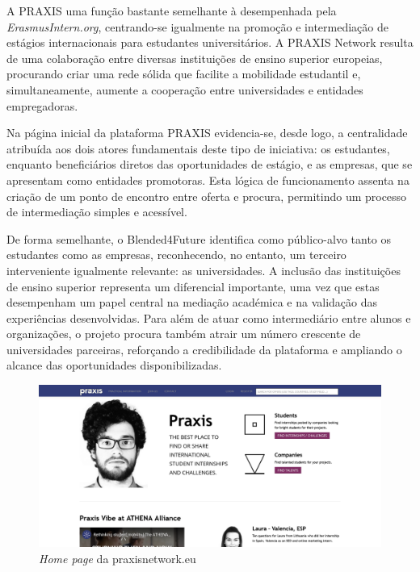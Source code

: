 A PRAXIS uma função bastante semelhante à desempenhada pela \textit{ErasmusIntern.org}, centrando-se igualmente na promoção e intermediação de estágios internacionais para estudantes universitários. A PRAXIS Network resulta de uma colaboração entre diversas instituições de ensino superior europeias, procurando criar uma rede sólida que facilite a mobilidade estudantil e, simultaneamente, aumente a cooperação entre universidades e entidades empregadoras. 

Na página inicial da plataforma PRAXIS evidencia-se, desde logo, a centralidade atribuída aos dois atores fundamentais deste tipo de iniciativa: os estudantes, enquanto beneficiários diretos das oportunidades de estágio, e as empresas, que se apresentam como entidades promotoras. Esta lógica de funcionamento assenta na criação de um ponto de encontro entre oferta e procura, permitindo um processo de intermediação simples e acessível.

De forma semelhante, o Blended4Future identifica como público-alvo tanto os estudantes como as empresas, reconhecendo, no entanto, um terceiro interveniente igualmente relevante: as universidades. A inclusão das instituições de ensino superior representa um diferencial importante, uma vez que estas desempenham um papel central na mediação académica e na validação das experiências desenvolvidas. Para além de atuar como intermediário entre alunos e organizações, o projeto procura também atrair um número crescente de universidades parceiras, reforçando a credibilidade da plataforma e ampliando o alcance das oportunidades disponibilizadas.

\begin{figure}[h!tbp]
    \centering
    \includegraphics[width=0.9\linewidth]{capitulos/cap2-estadodaarte/assets/image/praxis/praxis-homepage.png}
    \caption{\textit{Home page} da praxisnetwork.eu}
    \label{fig:praxis-homepage}
\end{figure}



